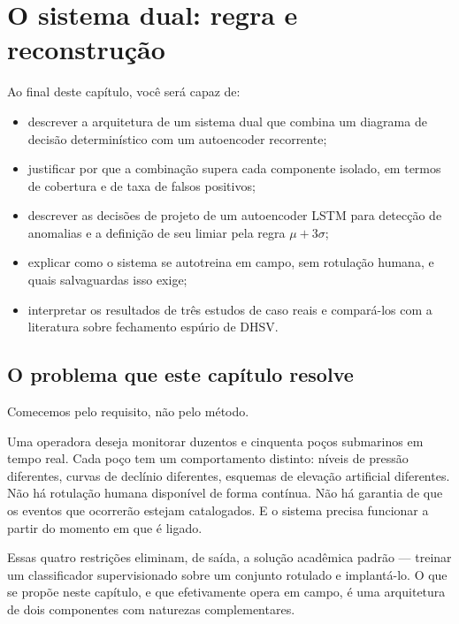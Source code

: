 \chapter{O sistema dual: regra e reconstrução}
\label{cap:dual}

\begin{objetivos}
Ao final deste capítulo, você será capaz de:
\begin{itemize}[leftmargin=*,itemsep=0.2em]
  \item descrever a arquitetura de um sistema dual que combina um diagrama de decisão
        determinístico com um autoencoder recorrente;
  \item justificar por que a combinação supera cada componente isolado, em termos de
        cobertura e de taxa de falsos positivos;
  \item descrever as decisões de projeto de um autoencoder LSTM para detecção de
        anomalias e a definição de seu limiar pela regra $\mu + 3\sigma$;
  \item explicar como o sistema se autotreina em campo, sem rotulação humana, e quais
        salvaguardas isso exige;
  \item interpretar os resultados de três estudos de caso reais e compará-los com a
        literatura sobre fechamento espúrio de DHSV.
\end{itemize}
\end{objetivos}

\section{O problema que este capítulo resolve}

Comecemos pelo requisito, não pelo método.

Uma operadora deseja monitorar duzentos e cinquenta poços submarinos em tempo real.
Cada poço tem um comportamento distinto: níveis de pressão diferentes, curvas de
declínio diferentes, esquemas de elevação artificial diferentes. Não há rotulação
humana disponível de forma contínua. Não há garantia de que os eventos que ocorrerão
estejam catalogados. E o sistema precisa funcionar a partir do momento em que é ligado.

Essas quatro restrições eliminam, de saída, a solução acadêmica padrão --- treinar um
classificador supervisionado sobre um conjunto rotulado e implantá-lo. O que se propõe
neste capítulo, e que efetivamente opera em campo, é uma arquitetura de dois
componentes com naturezas complementares.

